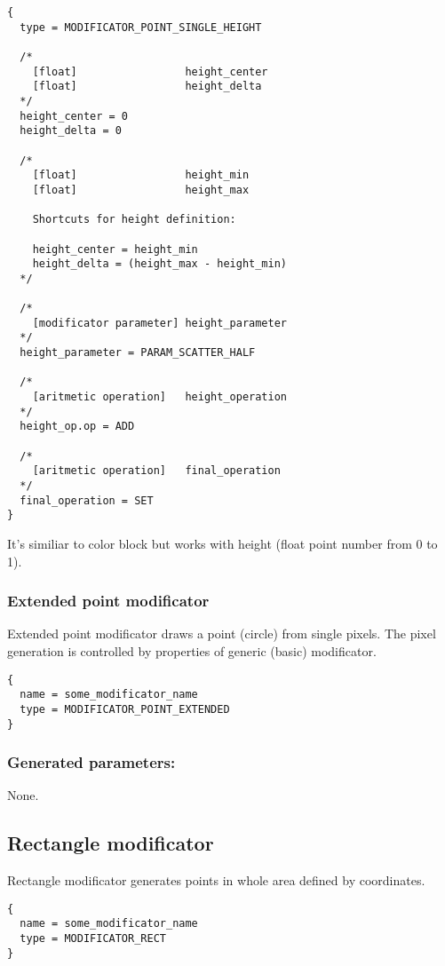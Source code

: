 \documentclass[9pt]{article}
\begin{document}
\begin{verbatim}
{
  type = MODIFICATOR_POINT_SINGLE_HEIGHT

  /*    
    [float]                 height_center
    [float]                 height_delta
  */
  height_center = 0
  height_delta = 0

  /*
    [float]                 height_min
    [float]                 height_max
    
    Shortcuts for height definition:

    height_center = height_min
    height_delta = (height_max - height_min)
  */
  
  /*
    [modificator parameter] height_parameter
  */  
  height_parameter = PARAM_SCATTER_HALF
  
  /*  
    [aritmetic operation]   height_operation
  */
  height_op.op = ADD
  
  /*  
    [aritmetic operation]   final_operation
  */
  final_operation = SET
}
\end{verbatim}
It's similiar to color block but works with height (float point number
from 0 to 1).

\subsubsection{Extended point modificator}

Extended point modificator draws a point (circle)
from single pixels. The pixel generation is controlled by 
properties of generic (basic) modificator.
\begin{verbatim}
{
  name = some_modificator_name
  type = MODIFICATOR_POINT_EXTENDED
}
\end{verbatim}

\subsubsection*{Generated parameters:}

None.

\subsection{Rectangle modificator}

Rectangle modificator generates points in whole area defined by coordinates.
\begin{verbatim}
{
  name = some_modificator_name
  type = MODIFICATOR_RECT
}
\end{verbatim}
\end{document}
